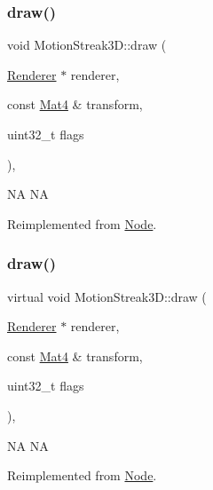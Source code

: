 \subsubsection{\texorpdfstring{draw()}{draw()}\hspace{0.1cm}{\footnotesize\ttfamily [1/2]}}
{\footnotesize\ttfamily void Motion\+Streak3\+D\+::draw (\begin{DoxyParamCaption}\item[{\hyperlink{classRenderer}{Renderer} $\ast$}]{renderer,  }\item[{const \hyperlink{classMat4}{Mat4} \&}]{transform,  }\item[{uint32\+\_\+t}]{flags }\end{DoxyParamCaption})\hspace{0.3cm}{\ttfamily [override]}, {\ttfamily [virtual]}}

NA  NA 

Reimplemented from \hyperlink{classNode_abcf85087a15901deb7c6c1231634c8ab}{Node}.

\mbox{\label{classMotionStreak3D_a3b13ccd501ac16227a117870695f34f1}} 
\subsubsection{\texorpdfstring{draw()}{draw()}\hspace{0.1cm}{\footnotesize\ttfamily [2/2]}}
{\footnotesize\ttfamily virtual void Motion\+Streak3\+D\+::draw (\begin{DoxyParamCaption}\item[{\hyperlink{classRenderer}{Renderer} $\ast$}]{renderer,  }\item[{const \hyperlink{classMat4}{Mat4} \&}]{transform,  }\item[{uint32\+\_\+t}]{flags }\end{DoxyParamCaption})\hspace{0.3cm}{\ttfamily [override]}, {\ttfamily [virtual]}}

NA  NA 

Reimplemented from \hyperlink{classNode_abcf85087a15901deb7c6c1231634c8ab}{Node}.

\mbox{\label{classMotionStreak3D_a74db7796ac204990d57ffb203fc7cfd1}} 
